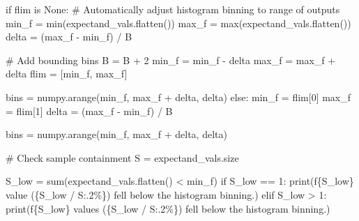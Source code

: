 \documentclass[
  letterpaper,
  DIV=11,
  numbers=noendperiod]{scrartcl}
\newenvironment{Shaded}{\begin{snugshade}}{\end{snugshade}}
\newcommand{\BuiltInTok}[1]{\textcolor[rgb]{0.00,0.23,0.31}{#1}}
\newcommand{\CommentTok}[1]{\textcolor[rgb]{0.37,0.37,0.37}{#1}}
\newcommand{\ControlFlowTok}[1]{\textcolor[rgb]{0.00,0.23,0.31}{#1}}
\newcommand{\DecValTok}[1]{\textcolor[rgb]{0.68,0.00,0.00}{#1}}
\newcommand{\KeywordTok}[1]{\textcolor[rgb]{0.00,0.23,0.31}{#1}}
\newcommand{\NormalTok}[1]{\textcolor[rgb]{0.00,0.23,0.31}{#1}}
\newcommand{\OperatorTok}[1]{\textcolor[rgb]{0.37,0.37,0.37}{#1}}
\newcommand{\SpecialCharTok}[1]{\textcolor[rgb]{0.37,0.37,0.37}{#1}}
\newcommand{\SpecialStringTok}[1]{\textcolor[rgb]{0.13,0.47,0.30}{#1}}
\newcommand{\StringTok}[1]{\textcolor[rgb]{0.13,0.47,0.30}{#1}}
\newcommand{\VariableTok}[1]{\textcolor[rgb]{0.07,0.07,0.07}{#1}}
\begin{document}
\begin{Shaded}
\begin{Highlighting}[]
  \ControlFlowTok{if}\NormalTok{ flim }\KeywordTok{is} \VariableTok{None}\NormalTok{:}
    \CommentTok{\# Automatically adjust histogram binning to range of outputs}
\NormalTok{    min\_f }\OperatorTok{=} \BuiltInTok{min}\NormalTok{(expectand\_vals.flatten())}
\NormalTok{    max\_f }\OperatorTok{=} \BuiltInTok{max}\NormalTok{(expectand\_vals.flatten())}
\NormalTok{    delta }\OperatorTok{=}\NormalTok{ (max\_f }\OperatorTok{{-}}\NormalTok{ min\_f) }\OperatorTok{/}\NormalTok{ B}

    \CommentTok{\# Add bounding bins}
\NormalTok{    B }\OperatorTok{=}\NormalTok{ B }\OperatorTok{+} \DecValTok{2}
\NormalTok{    min\_f }\OperatorTok{=}\NormalTok{ min\_f }\OperatorTok{{-}}\NormalTok{ delta}
\NormalTok{    max\_f }\OperatorTok{=}\NormalTok{ max\_f }\OperatorTok{+}\NormalTok{ delta}
\NormalTok{    flim }\OperatorTok{=}\NormalTok{ [min\_f, max\_f]}
    
\NormalTok{    bins }\OperatorTok{=}\NormalTok{ numpy.arange(min\_f, max\_f }\OperatorTok{+}\NormalTok{ delta, delta)}
  \ControlFlowTok{else}\NormalTok{:}
\NormalTok{    min\_f }\OperatorTok{=}\NormalTok{ flim[}\DecValTok{0}\NormalTok{]}
\NormalTok{    max\_f }\OperatorTok{=}\NormalTok{ flim[}\DecValTok{1}\NormalTok{]}
\NormalTok{    delta }\OperatorTok{=}\NormalTok{ (max\_f }\OperatorTok{{-}}\NormalTok{ min\_f) }\OperatorTok{/}\NormalTok{ B}

\NormalTok{    bins }\OperatorTok{=}\NormalTok{ numpy.arange(min\_f, max\_f }\OperatorTok{+}\NormalTok{ delta, delta)}
  
  \CommentTok{\# Check sample containment}
\NormalTok{  S }\OperatorTok{=}\NormalTok{ expectand\_vals.size}

\NormalTok{  S\_low }\OperatorTok{=} \BuiltInTok{sum}\NormalTok{(expectand\_vals.flatten() }\OperatorTok{\textless{}}\NormalTok{ min\_f)}
  \ControlFlowTok{if}\NormalTok{ S\_low }\OperatorTok{==} \DecValTok{1}\NormalTok{:}
    \BuiltInTok{print}\NormalTok{(}\SpecialStringTok{f\textquotesingle{}}\SpecialCharTok{\{}\NormalTok{S\_low}\SpecialCharTok{\}}\SpecialStringTok{ value (}\SpecialCharTok{\{}\NormalTok{S\_low }\OperatorTok{/}\NormalTok{ S}\SpecialCharTok{:.2\%\}}\SpecialStringTok{)\textquotesingle{}}
           \StringTok{\textquotesingle{} fell below the histogram binning.\textquotesingle{}}\NormalTok{)}
  \ControlFlowTok{elif}\NormalTok{ S\_low }\OperatorTok{\textgreater{}} \DecValTok{1}\NormalTok{:}
    \BuiltInTok{print}\NormalTok{(}\SpecialStringTok{f\textquotesingle{}}\SpecialCharTok{\{}\NormalTok{S\_low}\SpecialCharTok{\}}\SpecialStringTok{ values (}\SpecialCharTok{\{}\NormalTok{S\_low }\OperatorTok{/}\NormalTok{ S}\SpecialCharTok{:.2\%\}}\SpecialStringTok{)\textquotesingle{}}
           \StringTok{\textquotesingle{} fell below the histogram binning.\textquotesingle{}}\NormalTok{)}


\end{Highlighting}
\end{Shaded}
\end{document}
